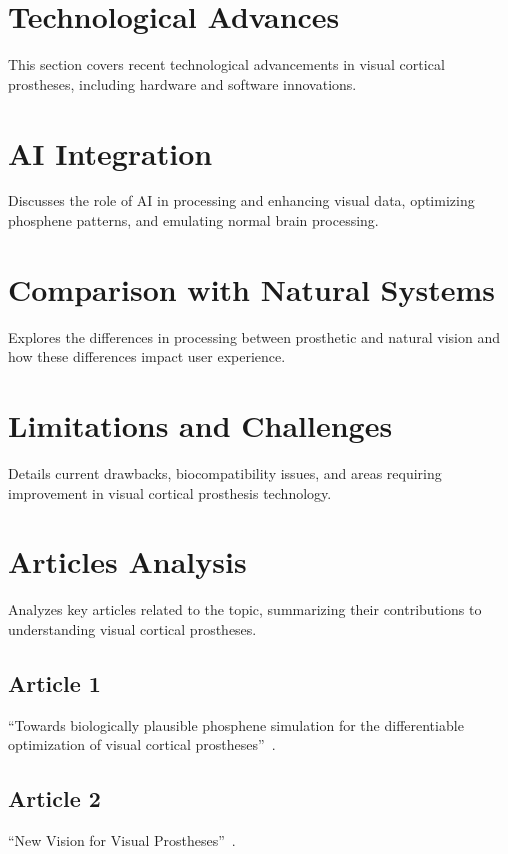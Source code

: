\documentclass[twocolumn,10pt]{article}
\begin{document}
\section{Technological Advances}\label{sec:tech_advances}
This section covers recent technological advancements in visual cortical prostheses, including hardware and software innovations.

\section{AI Integration}\label{sec:ai_integration}
Discusses the role of AI in processing and enhancing visual data, optimizing phosphene patterns, and emulating normal brain processing.

\section{Comparison with Natural Systems}\label{sec:comparison}
Explores the differences in processing between prosthetic and natural vision and how these differences impact user experience.

\section{Limitations and Challenges}\label{sec:limitations}
Details current drawbacks, biocompatibility issues, and areas requiring improvement in visual cortical prosthesis technology.

\section{Articles Analysis}\label{sec:articles}
Analyzes key articles related to the topic, summarizing their contributions to understanding visual cortical prostheses.

\subsection{Article 1}
``Towards biologically plausible phosphene simulation for the differentiable optimization of visual cortical prostheses''~\cite{vandergrintenBiologicallyPlausiblePhosphene2024}.

\subsection{Article 2}
``New Vision for Visual Prostheses''~\cite{farnumNewVisionVisual2020}.
\end{document}
